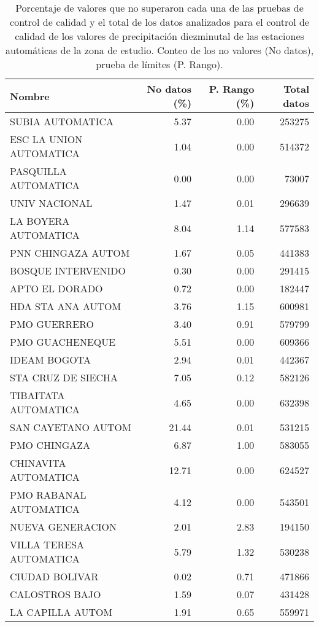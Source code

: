 \begin{table}[H]
\begin{center}


\caption{Porcentaje de valores que no superaron cada una de las pruebas de control de calidad y el total de los datos analizados para el control de calidad de los valores de precipitación diezminutal de las estaciones automáticas de la zona de estudio. Conteo de los no valores (No datos), prueba de límites (P. Rango).}
\label{tabla:val_precipitacion}
\begin{tabular}{lrrr}
\toprule
      Nombre &  No datos (\%) &  P. Rango (\%) & Total datos \\
\midrule
         SUBIA AUTOMATICA &      5.37 &      0.00 &        253275 \\
 ESC LA UNION AUTOMATICA &      1.04 &      0.00 &        514372 \\
    PASQUILLA AUTOMATICA &      0.00 &      0.00 &         73007 \\
           UNIV NACIONAL &      1.47 &      0.01 &        296639 \\
    LA BOYERA AUTOMATICA &      8.04 &      1.14 &        577583 \\
      PNN CHINGAZA AUTOM &      1.67 &      0.05 &        441383 \\
      BOSQUE INTERVENIDO &      0.30 &      0.00 &        291415 \\
          APTO EL DORADO &      0.72 &      0.00 &        182447 \\
       HDA STA ANA AUTOM &      3.76 &      1.15 &        600981 \\
            PMO GUERRERO &      3.40 &      0.91 &        579799 \\
         PMO GUACHENEQUE &      5.51 &      0.00 &        609366 \\
            IDEAM BOGOTA &      2.94 &      0.01 &        442367 \\
      STA CRUZ DE SIECHA &      7.05 &      0.12 &        582126 \\
    TIBAITATA AUTOMATICA &      4.65 &      0.00 &        632398 \\
      SAN CAYETANO AUTOM &     21.44 &      0.01 &        531215 \\
            PMO CHINGAZA &      6.87 &      1.00 &        583055 \\
    CHINAVITA AUTOMATICA &     12.71 &      0.00 &        624527 \\
  PMO RABANAL AUTOMATICA &      4.12 &      0.00 &        543501 \\
        NUEVA GENERACION &      2.01 &      2.83 &        194150 \\
 VILLA TERESA AUTOMATICA &      5.79 &      1.32 &        530238 \\
          CIUDAD BOLIVAR &      0.02 &      0.71 &        471866 \\
          CALOSTROS BAJO &      1.59 &      0.07 &        431428 \\
        LA CAPILLA AUTOM &      1.91 &      0.65 &        559971 \\
\bottomrule
\end{tabular}
\end{center}
\end{table}

